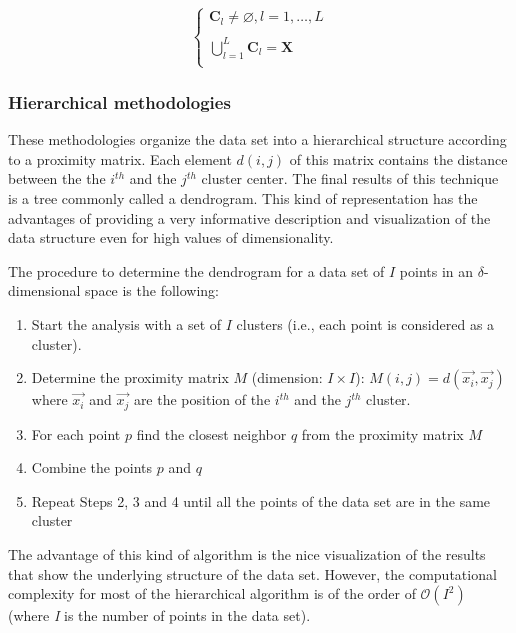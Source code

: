     \begin{equation}\label{eq: ClassRequier}
        \begin{cases} \mathbf{C}_{l}\neq\varnothing, l=1,\ldots,L \\
                        \\
                     \bigcup_{l=1}^{L}\mathbf{C}_{l}= \mathbf{X} \\
        \end{cases}
    \end{equation}

\subsubsection{Hierarchical methodologies}
\label{Hierarchical}

These methodologies organize the data set into a hierarchical structure according to a proximity matrix. Each element $d(i,j)$ of this matrix contains the distance between the the $i^{th}$ and the $j^{th}$ cluster center. The final results of this technique is a tree commonly called a dendrogram. This kind of representation has the advantages of providing a very informative description and visualization of the data structure even for high values of dimensionality.

The procedure to determine the dendrogram for a data set of $I$ points in an $\delta$-dimensional space is the following:

\begin{enumerate}
  \item Start the analysis with a set of $I$ clusters (i.e., each point is considered as a cluster).
  \item Determine the proximity matrix $M$ (dimension: $I\times I$): $M(i,j)= d(\vec{x_{i}},\vec{x_{j}})$ where $\vec{x_{i}}$ and $\vec{x_{j}}$ are the position of the $i^{th}$ and the $j^{th}$ cluster.
  \item For each point $p$ find the closest neighbor $q$  from the proximity matrix $M$
  \item Combine the points $p$ and $q$
  \item Repeat Steps 2, 3 and 4 until all the points of the data set are in the same cluster
\end{enumerate}

The advantage of this kind of algorithm is the nice visualization of the results that show the underlying structure of the data set. However, the computational complexity for most of the hierarchical algorithm is of the order of $\mathcal{O}(I^{2})$ (where \emph{I} is the number of points in the data set).

